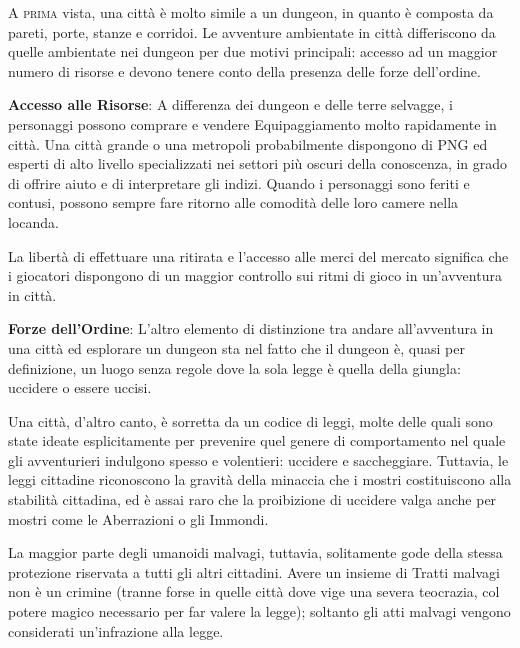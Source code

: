 \documentclass[a4paper,twoside,openany]{book}
\begin{document}
\begin{multicols}{2}

\lettrine[lines=2, lhang=0.33, loversize=0.25, findent=1.5em]{A}{ prima} vista, una città è molto simile a un dungeon, in quanto è composta da pareti, porte, stanze e corridoi. Le avventure ambientate in città differiscono da quelle ambientate nei dungeon per due motivi principali: accesso ad un maggior numero di risorse e devono tenere conto della presenza delle forze dell'ordine.

\textbf{Accesso alle Risorse}: A differenza dei dungeon e delle terre selvagge, i personaggi possono comprare e vendere Equipaggiamento molto rapidamente in città. Una città grande o una metropoli probabilmente dispongono di PNG ed esperti di alto livello specializzati nei settori più oscuri della conoscenza, in grado di offrire aiuto e di interpretare gli indizi. Quando i personaggi sono feriti e contusi, possono sempre fare ritorno alle comodità delle loro camere nella locanda.

La libertà di effettuare una ritirata e l'accesso alle merci del mercato significa che i giocatori dispongono di un maggior controllo sui ritmi di gioco in un'avventura in città.


\textbf{Forze dell'Ordine}: L'altro elemento di distinzione tra andare all'avventura in una città ed esplorare un dungeon sta nel fatto che il dungeon è, quasi per definizione, un luogo senza regole dove la sola legge è quella della giungla: uccidere o essere uccisi.

Una città, d'altro canto, è sorretta da un codice di leggi, molte delle quali sono state ideate esplicitamente per prevenire quel genere di comportamento nel quale gli avventurieri indulgono spesso e volentieri: uccidere e saccheggiare. Tuttavia, le leggi cittadine riconoscono la gravità della minaccia che i mostri costituiscono alla stabilità cittadina, ed è assai raro che la proibizione di uccidere valga anche per mostri come le Aberrazioni o gli Immondi.

La maggior parte degli umanoidi malvagi, tuttavia, solitamente gode della stessa protezione riservata a tutti gli altri cittadini. Avere un insieme di Tratti malvagi non è un crimine (tranne forse in quelle città dove vige una severa teocrazia, col potere magico necessario per far valere la legge); soltanto gli atti malvagi vengono considerati un'infrazione alla legge.



\end{multicols}
\end{document}
